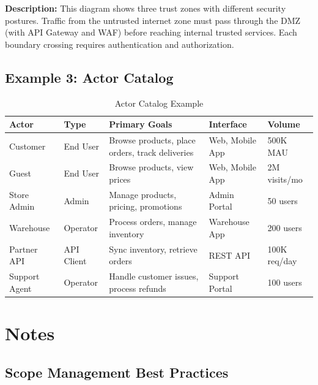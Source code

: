 \documentclass[11pt,letterpaper]{article}
\begin{document}
\textbf{Description:} This diagram shows three trust zones with different security postures. Traffic from the untrusted internet zone must pass through the DMZ (with API Gateway and WAF) before reaching internal trusted services. Each boundary crossing requires authentication and authorization.

\subsection{Example 3: Actor Catalog}

\begin{table}[H]
\centering
\caption{Actor Catalog Example}
\small
\begin{tabular}{@{}L{2cm}L{2cm}L{3.5cm}L{2.5cm}L{2.5cm}@{}}
\toprule
\textbf{Actor} & \textbf{Type} & \textbf{Primary Goals} & \textbf{Interface} & \textbf{Volume} \\
\midrule
Customer & End User & Browse products, place orders, track deliveries & Web, Mobile App & 500K MAU \\
\addlinespace
Guest & End User & Browse products, view prices & Web, Mobile App & 2M visits/mo \\
\addlinespace
Store Admin & Admin & Manage products, pricing, promotions & Admin Portal & 50 users \\
\addlinespace
Warehouse & Operator & Process orders, manage inventory & Warehouse App & 200 users \\
\addlinespace
Partner API & API Client & Sync inventory, retrieve orders & REST API & 100K req/day \\
\addlinespace
Support Agent & Operator & Handle customer issues, process refunds & Support Portal & 100 users \\
\bottomrule
\end{tabular}
\end{table}

\section{Notes}

\subsection{Scope Management Best Practices}
\end{document}
